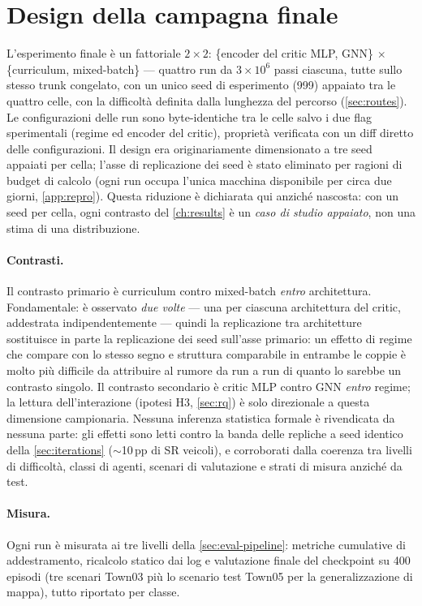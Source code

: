 \section{Design della campagna finale}
\label{sec:campaign}

L'esperimento finale è un fattoriale $2 \times 2$:
\{encoder del critic MLP, GNN\} $\times$ \{curriculum, mixed-batch\} ---
quattro run da $3\times10^{6}$ passi ciascuna, tutte sullo stesso trunk
congelato, con un unico seed di esperimento (999) appaiato tra le
quattro celle, con la difficoltà definita dalla lunghezza del percorso
(\cref{sec:routes}). Le configurazioni delle run sono byte-identiche tra
le celle salvo i due flag sperimentali (regime ed encoder del critic),
proprietà verificata con un diff diretto delle configurazioni. Il design
era originariamente dimensionato a tre seed appaiati per cella; l'asse
di replicazione dei seed è stato eliminato per ragioni di budget di
calcolo (ogni run occupa l'unica macchina disponibile per circa due
giorni, \cref{app:repro}). Questa riduzione è dichiarata qui anziché
nascosta: con un seed per cella, ogni contrasto del \cref{ch:results} è
un \emph{caso di studio appaiato}, non una stima di una distribuzione.

\paragraph{Contrasti.}
Il contrasto primario è curriculum contro mixed-batch \emph{entro}
architettura. Fondamentale: è osservato \emph{due volte} --- una per
ciascuna architettura del critic, addestrata indipendentemente ---
quindi la replicazione tra architetture sostituisce in parte la
replicazione dei seed sull'asse primario: un effetto di regime che
compare con lo stesso segno e struttura comparabile in entrambe le
coppie è molto più difficile da attribuire al rumore da run a run di
quanto lo sarebbe un contrasto singolo. Il contrasto secondario è critic
MLP contro GNN \emph{entro} regime; la lettura dell'interazione
(ipotesi H3, \cref{sec:rq}) è solo direzionale a questa dimensione
campionaria. Nessuna inferenza statistica formale è rivendicata da
nessuna parte: gli effetti sono letti contro la banda delle repliche a
seed identico della \cref{sec:iterations} ($\sim$10\,pp di SR veicoli),
e corroborati dalla coerenza tra livelli di difficoltà, classi di
agenti, scenari di valutazione e strati di misura anziché da test.

\paragraph{Misura.}
Ogni run è misurata ai tre livelli della \cref{sec:eval-pipeline}:
metriche cumulative di addestramento, ricalcolo statico dai log e
valutazione finale del checkpoint su 400 episodi (tre scenari Town03
più lo scenario test Town05 per la generalizzazione di mappa), tutto
riportato per classe.

